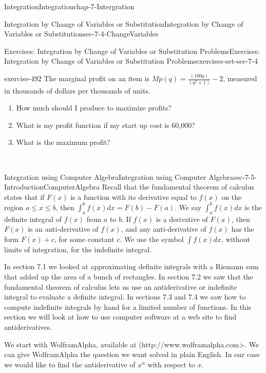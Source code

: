 \documentclass[oneside,10pt,]{book}
\numberwithin{equation}{section}
\begin{document}
\begin{chapterptx}{Integration}{}{Integration}{}{}{chap-7-Intergration}
\begin{sectionptx}{Integration by Change of Variables or Substitution}{}{Integration by Change of Variables or Substitution}{}{}{sec-7-4-ChangeVariables}
\begin{exercises-subsection-numberless}{Exercises: Integration by Change of Variables or Substitution Problems}{}{Exercises: Integration by Change of Variables or Substitution Problems}{}{}{exercises-set-sec-7-4}
\begin{divisionexercise}{24}{}{}{exercise-492}%
\hypertarget{p-2876}{}%
The marginal profit on an item is \(Mp(q)=\frac{(100q)}{(q^2+1)}-2\), measured in thousands of dollars per thousands of units.%
\leavevmode%
\begin{enumerate}[label=(\alph*)]
\item\hypertarget{li-768}{}\hypertarget{p-2877}{}%
How much should I produce to maximize profits?%
\item\hypertarget{li-769}{}\hypertarget{p-2878}{}%
What is my profit function if my start up cost is \textdollar{}60,000?%
\item\hypertarget{li-770}{}\hypertarget{p-2879}{}%
What is the maximum profit?%
\end{enumerate}
\end{divisionexercise}%
  \end{exercises-subsection-numberless}
\end{sectionptx}
%
%
\typeout{************************************************}
\typeout{************************************************}
%
\begin{sectionptx}{Integration using Computer Algebra}{}{Integration using Computer Algebra}{}{}{sec-7-5-IntroductionComputerAlgebra}
\hypertarget{p-2880}{}%
Recall that the fundamental theorem of calculus states that if \(F(x)\) is a function with its derivative equal to \(f(x)\) on the region \(a \le  x \le  b\), then  \(\int_a^b f(x)dx=F(b)-F(a)\).  We say \(\int_a^b f(x)dx\)  is the definite integral of \(f(x)\) from \(a\) to \(b\).  If \(f(x)\) is a derivative of \(F(x)\), then \(F(x)\) is an anti-derivative of \(f(x)\), and any anti-derivative of \(f(x)\) has the form \(F(x) + c\), for some constant \(c\).  We use the symbol  \(\int f(x)dx\), without limits of integration, for the indefinite integral.%
\par
\hypertarget{p-2881}{}%
In section 7.1 we looked at approximating definite integrals with a Riemann sum that added up the area of a bunch of rectangles.  In section 7.2 we saw that the fundamental theorem of calculus lets us use an antiderivative or indefinite integral to evaluate a definite integral.  In sections 7.3 and 7.4 we saw how to compute indefinite integrals by hand for a limited number of functions.  In this section we will look at how to use computer software at a web site to find antiderivatives.%
\par
\hypertarget{p-2882}{}%
We start with Wolfram\textbar{}Alpha, available at (http:\slash{}\slash{}www.wolframalpha.com\textgreater{}.  We can give Wolfram\textbar{}Alpha the question we want solved in plain English.  In our case we would like to find the antiderivative of \(x^n\) with respect to \(x\).%

\end{sectionptx}
\end{chapterptx}
\end{document}

